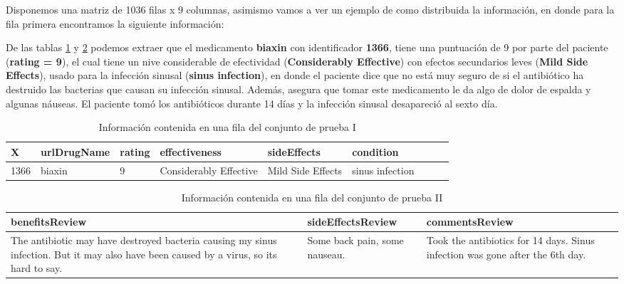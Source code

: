 \documentclass[spanish,]{article}
\begin{document}
Disponemos una matriz de 1036 filas x 9 columnas, asimismo vamos a ver
un ejemplo de como distribuida la información, en donde para la fila
primera encontramos la siguiente información:

De las tablas \ref{tabla:datos_testI} y \ref{tabla:datos_testII} podemos
extraer que el medicamento \textbf{biaxin} con identificador
\textbf{1366}, tiene una puntuación de 9 por parte del paciente
(\textbf{rating = 9}), el cual tiene un nive considerable de efectividad
(\textbf{Considerably Effective}) con efectos secundarios leves
(\textbf{Mild Side Effects}), usado para la infección sinusal
(\textbf{sinus infection}), en donde el paciente dice que no está muy
seguro de si el antibiótico ha destruido las bacterias que causan su
infección sinusal. Además, asegura que tomar este medicamento le da algo
de dolor de espalda y algunas náuseas. El paciente tomó los antibióticos
durante 14 días y la infección sinusal desapareció al sexto día.

\begin{table}[h]
  \centering
    \begin{tabular}{|l|l|l|l|l|l|l|l|l|}
      \hline
      \rowcolor[rgb]{0.94,0.97,1.0} \textbf{X} & \textbf{urlDrugName} & \textbf{rating} & \textbf{effectiveness} 
      & \textbf{sideEffects} &\textbf{condition} \\ \hline
      1366 & biaxin & 9 & Considerably Effective & Mild Side Effects & sinus infection  \\ \hline
    \end{tabular}
  \caption{Información contenida en una fila del conjunto de prueba I}
  \label{tabla:datos_testI}
\end{table}

\begin{table}[h]
  \centering
    \begin{tabular}{|m{7cm}|m{3cm}|m{5cm}|}
      \hline
      \rowcolor[rgb]{0.94,0.97,1.0} \textbf{benefitsReview} & \textbf{sideEffectsReview} & \textbf{commentsReview} \\ \hline
      The antibiotic may have destroyed bacteria causing my sinus infection. But it may also have been caused by a virus, so its hard to say. & Some back pain, some nauseau. & Took the antibiotics for 14 days. Sinus infection was gone after the 6th day. \\ \hline
    \end{tabular}
  \caption{Información contenida en una fila del conjunto de prueba II}
  \label{tabla:datos_testII}
\end{table}
\end{document}
